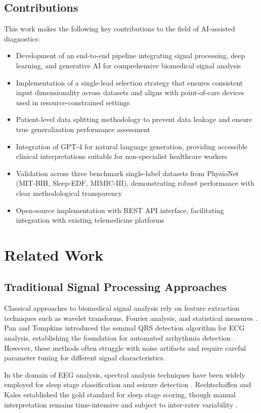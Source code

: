 \documentclass[conference]{IEEEtran}
\begin{document}
\subsection{Contributions}
This work makes the following key contributions to the field of AI-assisted diagnostics:
\begin{itemize}
\item Development of an end-to-end pipeline integrating signal processing, deep learning, and generative AI for comprehensive biomedical signal analysis
\item Implementation of a single-lead selection strategy that ensures consistent input dimensionality across datasets and aligns with point-of-care devices used in resource-constrained settings
\item Patient-level data splitting methodology to prevent data leakage and ensure true generalization performance assessment
\item Integration of GPT-4 for natural language generation, providing accessible clinical interpretations suitable for non-specialist healthcare workers
\item Validation across three benchmark single-label datasets from PhysioNet (MIT-BIH, Sleep-EDF, MIMIC-III), demonstrating robust performance with clear methodological transparency
\item Open-source implementation with REST API interface, facilitating integration with existing telemedicine platforms
\end{itemize}

\section{Related Work}

\subsection{Traditional Signal Processing Approaches}
Classical approaches to biomedical signal analysis rely on feature extraction techniques such as wavelet transforms, Fourier analysis, and statistical measures \cite{rangayyan2015}. Pan and Tompkins introduced the seminal QRS detection algorithm for ECG analysis, establishing the foundation for automated arrhythmia detection \cite{pan1985}. However, these methods often struggle with noise artifacts and require careful parameter tuning for different signal characteristics.

In the domain of EEG analysis, spectral analysis techniques have been widely employed for sleep stage classification and seizure detection \cite{niedermeyer2005}. Rechtschaffen and Kales established the gold standard for sleep stage scoring, though manual interpretation remains time-intensive and subject to inter-rater variability \cite{rechtschaffen1968}.
\end{document}

